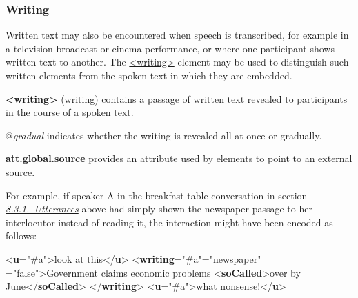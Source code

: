 \subsubsection[{Writing}]{Writing}\label{TSBAWR}\par
Written text may also be encountered when speech is transcribed, for example in a television broadcast or cinema performance, or where one participant shows written text to another. The \hyperref[TEI.writing]{<writing>} element may be used to distinguish such written elements from the spoken text in which they are embedded. 
\begin{sansreflist}
  
\item [\textbf{<writing>}] (writing) contains a passage of written text revealed to participants in the course of a spoken text.\hfil\\[-10pt]\begin{sansreflist}
    \item[@{\itshape gradual}]
  indicates whether the writing is revealed all at once or gradually.
\end{sansreflist}  
\item [\textbf{att.global.source}] provides an attribute used by elements to point to an external source.
\end{sansreflist}
  For example, if speaker A in the breakfast table conversation in section \textit{\hyperref[TSBAUT]{8.3.1.\ Utterances}} above had simply shown the newspaper passage to her interlocutor instead of reading it, the interaction might have been encoded as follows: \par\bgroup{}\exampleFont \begin{shaded}\noindent\mbox{}{<\textbf{u}\hspace*{1em}{who}="{\#a}">}look at this{</\textbf{u}>}\mbox{}\newline 
{<\textbf{writing}\hspace*{1em}{who}="{\#a}"\hspace*{1em}{type}="{newspaper}"\mbox{}\newline 
\hspace*{1em}{gradual}="{false}">}Government claims economic problems\mbox{}\newline 
{<\textbf{soCalled}>}over by June{</\textbf{soCalled}>}\mbox{}\newline 
{</\textbf{writing}>}\mbox{}\newline 
{<\textbf{u}\hspace*{1em}{who}="{\#a}">}what nonsense!{</\textbf{u}>}\end{shaded}\egroup\par \par
